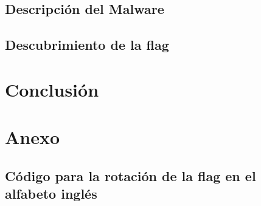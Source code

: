 \documentclass[]{article}
\begin{document}
\subsection{Descripción del Malware}
\label{malware1}

\subsection{Descubrimiento de la flag}
\label{flag1}


\section{Conclusión}
\label{sec:conclusion}

\newpage
\section*{Anexo}

\subsection*{Código para la rotación de la flag en el alfabeto inglés}
\lstset{style=python}

\end{document}
